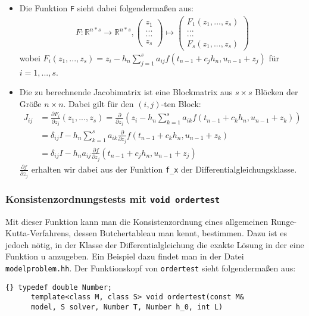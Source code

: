 \documentclass[a4paper,11pt]{article}
\theoremstyle{definition}
\begin{document}
\begin{itemize}
\item Die Funktion \lstinline{F} sieht dabei folgendermaßen aus:
  \begin{align*}
    F: \mathbb{R}^{n*s} \to \mathbb{R}^{n*s}, \left( \begin{array}{c}z_1 \\...\\...\\z_s\end{array} \right) \mapsto \left( \begin{array}{c}F_1(z_1,...,z_s)\\...\\...\\F_s(z_1,...,z_s)\end{array} \right)
  \end{align*}
  wobei $F_i(z_1,...,z_s) = z_i-h_n \sum_{j=1}^s
  a_{ij}f(t_{n-1}+c_jh_n, u_{n-1}+z_j)$ für $i = 1,...,s$.

\item Die zu berechnende Jacobimatrix ist eine Blockmatrix aus
  $s\times s$ Blöcken der Größe $n \times n$. Dabei gilt für den
  $(i,j)$-ten Block:
  \begin{align}
    J_{ij} &= \frac{\partial F_i}{\partial z_j}(z_1,...,z_s) = \frac{\partial}{\partial z_j}(z_i - h_n \sum_{k=1}^s a_{ik}f(t_{n-1}+c_kh_n, u_{n-1}+z_k)) \\
           &= \delta_{ij}I-h_n \sum_{k=1}^s a_{ik} \frac{\partial}{\partial z_j}f(t_{n-1}+c_kh_n, u_{n-1}+z_k)\\
           &= \delta_{ij}I-h_n a_{ij} \frac{\partial f}{\partial z_j}(t_{n-1}+c_jh_n, u_{n-1}+z_j)
  \end{align}
  $ \frac{\partial f}{\partial z_j}$ erhalten wir dabei aus der
  Funktion \lstinline{f_x} der Differentialgleichungsklasse.
\end{itemize}

\subsubsection{Konsistenzordnungstests mit \lstinline{void ordertest}}

Mit dieser Funktion kann man die Konsistenzordnung eines allgemeinen
Runge-Kutta-Verfahrens, dessen Butchertableau man kennt,
bestimmen. Dazu ist es jedoch nötig, in der Klasse der
Differentialgleichung die exakte Lösung in der eine Funktion u
anzugeben.  Ein Beispiel dazu findet man in der Datei
\lstinline{modelproblem.hh}.  Der Funktionskopf von
\lstinline{ordertest} sieht folgendermaßen aus:
{\footnotesize{\begin{lstlisting}{} typedef double Number;
      template<class M, class S> void ordertest(const M&
      model, S solver, Number T, Number h_0, int L)
    \end{lstlisting}}}
\end{document}
